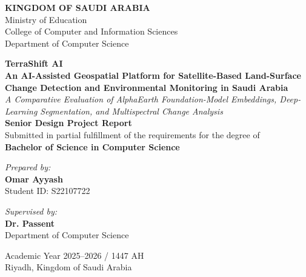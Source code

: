 \begin{titlepage}
\begin{center}

{\Large \textbf{KINGDOM OF SAUDI ARABIA}}\\[0.2cm]
{\large Ministry of Education}\\[0.2cm]
{\large College of Computer and Information Sciences}\\[0.2cm]
{\large Department of Computer Science}\\[1.5cm]

\vspace*{0.5cm}

{\Huge \textbf{TerraShift AI}}\\[0.5cm]
{\Large \textbf{An AI-Assisted Geospatial Platform for Satellite-Based Land-Surface Change Detection and Environmental Monitoring in Saudi Arabia}}\\[0.8cm]
{\large \textit{A Comparative Evaluation of AlphaEarth Foundation-Model Embeddings, Deep-Learning Segmentation, and Multispectral Change Analysis}}\\[2.0cm]

\textbf{Senior Design Project Report}\\[0.3cm]
Submitted in partial fulfillment of the requirements for the degree of\\
\textbf{Bachelor of Science in Computer Science}\\[2.0cm]

\begin{minipage}{0.45\textwidth}
\begin{flushleft} \large
\emph{Prepared by:}\\
\textbf{Omar Ayyash}\\
Student ID: S22107722
\end{flushleft}
\end{minipage}
\begin{minipage}{0.45\textwidth}
\begin{flushright} \large
\emph{Supervised by:}\\
\textbf{Dr. Passent}\\
Department of Computer Science
\end{flushright}
\end{minipage}

\vfill

{\large Academic Year 2025--2026 / 1447 AH}\\[0.2cm]
{\large Riyadh, Kingdom of Saudi Arabia}

\end{center}
\end{titlepage}
\newpage
